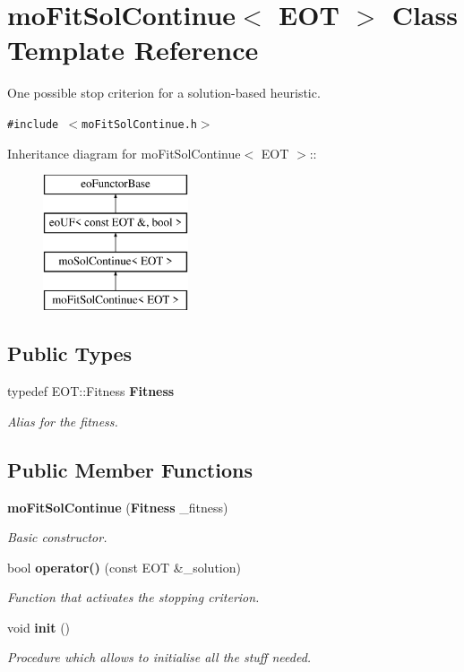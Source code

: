 \section{mo\-Fit\-Sol\-Continue$<$ EOT $>$ Class Template Reference}
\label{classmo_fit_sol_continue}
One possible stop criterion for a solution-based heuristic.  


{\tt \#include $<$mo\-Fit\-Sol\-Continue.h$>$}

Inheritance diagram for mo\-Fit\-Sol\-Continue$<$ EOT $>$::\begin{figure}[H]
\begin{center}
\leavevmode
\includegraphics[height=4cm]{classmo_fit_sol_continue}
\end{center}
\end{figure}
\subsection*{Public Types}
\begin{CompactItemize}
\item 
typedef EOT::Fitness {\bf Fitness}\label{classmo_fit_sol_continue_w0}

\begin{CompactList}\small\item\em Alias for the fitness. \item\end{CompactList}\end{CompactItemize}
\subsection*{Public Member Functions}
\begin{CompactItemize}
\item 
{\bf mo\-Fit\-Sol\-Continue} ({\bf Fitness} \_\-fitness)
\begin{CompactList}\small\item\em Basic constructor. \item\end{CompactList}\item 
bool {\bf operator()} (const EOT \&\_\-solution)
\begin{CompactList}\small\item\em Function that activates the stopping criterion. \item\end{CompactList}\item 
void {\bf init} ()
\begin{CompactList}\small\item\em Procedure which allows to initialise all the stuff needed. \item\end{CompactList}\end{CompactItemize}
